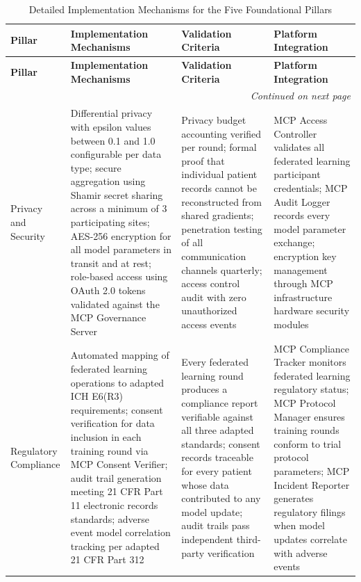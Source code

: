 \begin{longtable}{l p{3.5cm} p{3.5cm} p{3.5cm}}
\caption{Detailed Implementation Mechanisms for the Five Foundational Pillars}
\label{tab:fl-pillar-details} \\
\toprule
\textbf{Pillar} & \textbf{Implementation Mechanisms} & \textbf{Validation Criteria} & \textbf{Platform Integration} \\
\midrule
\endfirsthead
\toprule
\textbf{Pillar} & \textbf{Implementation Mechanisms} & \textbf{Validation Criteria} & \textbf{Platform Integration} \\
\midrule
\endhead
\midrule
\multicolumn{4}{r}{\textit{Continued on next page}} \\
\bottomrule
\endfoot
\bottomrule
\endlastfoot
Privacy and Security & Differential privacy with epsilon values between 0.1 and 1.0 configurable per data type; secure aggregation using Shamir secret sharing across a minimum of 3 participating sites; AES-256 encryption for all model parameters in transit and at rest; role-based access using OAuth 2.0 tokens validated against the MCP Governance Server & Privacy budget accounting verified per round; formal proof that individual patient records cannot be reconstructed from shared gradients; penetration testing of all communication channels quarterly; access control audit with zero unauthorized access events & MCP Access Controller validates all federated learning participant credentials; MCP Audit Logger records every model parameter exchange; encryption key management through MCP infrastructure hardware security modules \\
\midrule
Regulatory Compliance & Automated mapping of federated learning operations to adapted ICH E6(R3) \cite{ich-adapt} requirements; consent verification for data inclusion in each training round via MCP Consent Verifier; audit trail generation meeting 21 CFR Part 11 electronic records standards; adverse event model correlation tracking per adapted 21 CFR Part 312 \cite{cfr312-adapt} & Every federated learning round produces a compliance report verifiable against all three adapted standards; consent records traceable for every patient whose data contributed to any model update; audit trails pass independent third-party verification & MCP Compliance Tracker monitors federated learning regulatory status; MCP Protocol Manager ensures training rounds conform to trial protocol parameters; MCP Incident Reporter generates regulatory filings when model updates correlate with adverse events \\
\midrule

\end{longtable}
